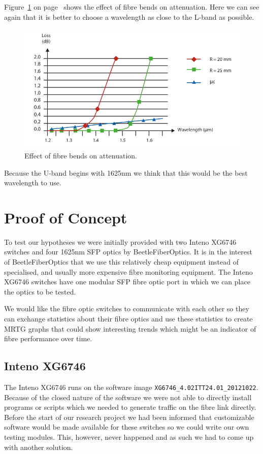 \documentclass{article}
\begin{document}
Figure~\ref{fig:attenuation-bends} on page~\pageref{fig:attenuation-bends} shows the effect of fibre bends on attenuation. Here we can see again that it is better to choose a wavelength as close to the L-band as possible.
\begin{figure}[h]
\centerline{\includegraphics[scale=0.3, trim = 0mm 0mm 0mm 0mm]{images/attenuation-bends.png}}
\caption{Effect of fibre bends on attenuation.\cite[p. 27]{refguide:2011}}
\label{fig:attenuation-bends}
\end{figure}

Because the U-band begins with 1625nm we think that this would be the best wavelength to use.

\newpage
\section{Proof of Concept}
To test our hypotheses we were initially provided with two Inteno XG6746\cite{Inteno:XG6746} switches and four 1625nm SFP optics by BeetleFiberOptics.
It is in the interest of BeetleFiberOptics that we use this relatively cheap equipment instead of specialised, and usually more expensive fibre monitoring equipment.
The Inteno XG6746 switches have one modular SFP fibre optic port in which we can place the optics to be tested. 

We would like the fibre optic switches to communicate with each other so they can exchange statistics about their fibre optics and use these statistics to create MRTG\cite{MRTG:MRTG} graphs that could show interesting trends which might be an indicator of fibre performance over time.

\subsection{Inteno XG6746}
The Inteno XG6746 runs on the software image \texttt{XG6746\_4.02ITT24.01\_20121022}.
Because of the closed nature of the software we were not able to directly install programs or scripts which we needed to generate traffic on the fibre link directly.
Before the start of our research project we had been informed that customizable software would be made available for these switches so we could write our own testing modules.
This, however, never happened and as such we had to come up with another solution.
\end{document}
